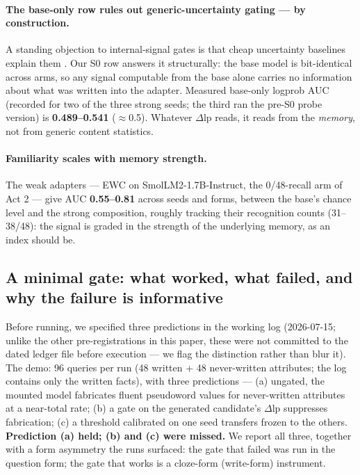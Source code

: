 \documentclass[11pt]{article}
\newcommand{\smol}{SmolLM2-1.7B-Instruct}
\newcommand{\dlp}{\Delta\mathrm{lp}}
\begin{document}
\paragraph{The base-only row rules out generic-uncertainty gating --- by construction.} A
standing objection to internal-signal gates is that cheap uncertainty baselines explain them
\citep{cheapuncertainty2025}. Our S0 row answers it structurally: the base model is bit-identical
across arms, so any signal computable from the base alone carries no information about what was
written into the adapter. Measured base-only logprob AUC (recorded for two of the three strong seeds; the third ran the
pre-S0 probe version) is \textbf{0.489--0.541}
($\approx$0.5). Whatever $\dlp$ reads, it reads from the \emph{memory}, not from generic content
statistics.

\paragraph{Familiarity scales with memory strength.} The weak adapters --- EWC on \smol{}, the
0/48-recall arm of Act 2 --- give AUC \textbf{0.55--0.81} across seeds and forms, between the
base's chance level and the strong composition, roughly tracking their recognition counts
(31--38/48): the signal is graded in the strength of the underlying memory, as an index should
be.

\subsection{A minimal gate: what worked, what failed, and why the failure is informative}
\label{sec:gate}

Before running, we specified three predictions in the working log (2026-07-15; unlike the other
pre-registrations in this paper, these were not committed to the dated ledger file before
execution --- we flag the distinction rather than blur it). The demo: 96 queries per run
(48 written + 48 never-written attributes; the log contains only the written facts), with three
predictions --- (a) ungated, the mounted model fabricates fluent pseudoword values for
never-written attributes at a near-total rate; (b) a gate on the generated candidate's $\dlp$
suppresses fabrication; (c) a threshold calibrated on one seed transfers frozen to the others.
\textbf{Prediction (a) held; (b) and (c) were missed.} We report all three, together with a
form asymmetry the runs surfaced: the gate that failed was run in the question form; the gate
that works is a cloze-form (write-form) instrument.
\end{document}
